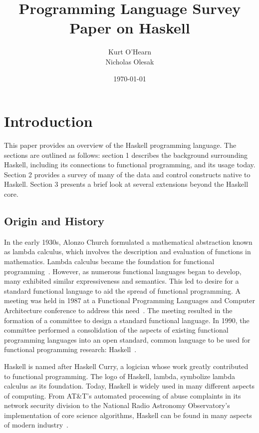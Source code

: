 \documentclass[titlepage,12pt]{article}
\title{Programming Language Survey Paper on Haskell}
\author{
        Kurt O'Hearn\\
        Nicholas Olesak\\
}
\date{\today}
\begin{document}
\maketitle 
\setcounter{tocdepth}{3}
\tableofcontents \newpage


\section{Introduction}
This paper provides an overview of the Haskell programming language.  The sections are outlined as follows:
section 1 describes the background surrounding Haskell, including its connections to functional programming,
and its usage today.  Section 2 provides a survey of many of the data and control constructs native to Haskell.
Section 3 presents a brief look at several extensions beyond the Haskell core.

\subsection{Origin and History}

In the early 1930s, Alonzo Church formulated a mathematical abstraction known as lambda calculus, which involves the description 
and evaluation of functions in mathematics. Lambda calculus became the foundation for functional programming~\cite{haskell-wiki}. 
However, as numerous functional languages began to develop, many exhibited similar expressiveness and semantics.  This led to
desire for a standard functional language to aid the spread of functional programming. A meeting was held 
in 1987 at a Functional Programming Languages and Computer Architecture conference to address this need~\cite{hudak-hist}. The meeting 
resulted in the formation of a committee to design a standard functional language. In 1990, the committee performed 
a consolidation of the aspects of existing functional programming languages into an open standard, common language to be used for 
functional programming research: Haskell~\cite{hudak-con}.

Haskell is named after Haskell Curry, a logician whose work greatly contributed to functional programming. The logo of Haskell, lambda,
symbolize lambda calculus as its foundation. Today, Haskell is widely used in many different aspects 
of computing. From AT\&T's automated processing of abuse complaints in its network security division to the National 
Radio Astronomy Observatory’s implementation of core science algorithms, Haskell can be found in many aspects of 
modern industry~\cite{haskell-wiki}. 
\end{document}
